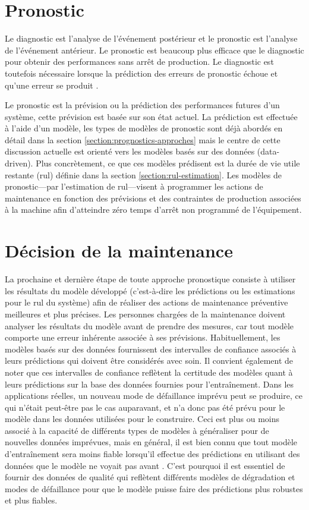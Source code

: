 \section{Pronostic}
Le diagnostic est l'analyse de l'événement postérieur et le pronostic est l'analyse de l'événement antérieur. Le pronostic est beaucoup plus efficace que le diagnostic pour obtenir des performances sans arrêt de production. Le diagnostic est toutefois nécessaire lorsque la prédiction des erreurs de pronostic échoue et qu'une erreur se produit \cite{Jardine2006}.

Le pronostic est la prévision ou la prédiction des performances futures d'un système, cette prévision est basée sur son état actuel. La prédiction est effectuée à l'aide d'un modèle, les types de modèles de pronostic sont déjà abordés en détail dans la section \ref{section:prognostics-approches} mais le centre de cette discussion actuelle est orienté vers les modèles basés sur des données (data-driven). Plus concrètement, ce que ces modèles prédisent est la durée de vie utile restante (\acrshort{rul}) définie dans la section \ref{section:rul-estimation}. Les modèles de pronostic---par l'estimation de \acrshort{rul}---visent à programmer les actions de maintenance en fonction des prévisions et des contraintes de production associées à la machine afin d'atteindre zéro temps d'arrêt non programmé de l'équipement.

\section{Décision de la maintenance}
La prochaine et dernière étape de toute approche pronostique consiste à utiliser les résultats du modèle développé (c'est-à-dire les prédictions ou les estimations pour le \acrshort{rul} du système) afin de réaliser des actions de maintenance préventive meilleures et plus précises. Les personnes chargées de la maintenance doivent analyser les résultats du modèle avant de prendre des mesures, car tout modèle comporte une erreur inhérente associée à ses prévisions. Habituellement, les modèles basés sur des données fournissent des intervalles de confiance associés à leurs prédictions qui doivent être considérés avec soin. Il convient également de noter que ces intervalles de confiance reflètent la certitude des modèles quant à leurs prédictions sur la base des données fournies pour l'entraînement. Dans les applications réelles, un nouveau mode de défaillance imprévu peut se produire, ce qui n'était peut-être pas le cas auparavant, et n'a donc pas été prévu pour le modèle dans les données utilisées pour le construire. Ceci est plus ou moins associé à la capacité de différents types de modèles à généraliser pour de nouvelles données imprévues, mais en général, il est bien connu que tout modèle d'entraînement sera moins fiable lorsqu'il effectue des prédictions en utilisant des données que le modèle ne voyait pas avant \cite{Chung2018}. C'est pourquoi il est essentiel de fournir des données de qualité qui reflètent différents modèles de dégradation et modes de défaillance pour que le modèle puisse faire des prédictions plus robustes et plus fiables.

